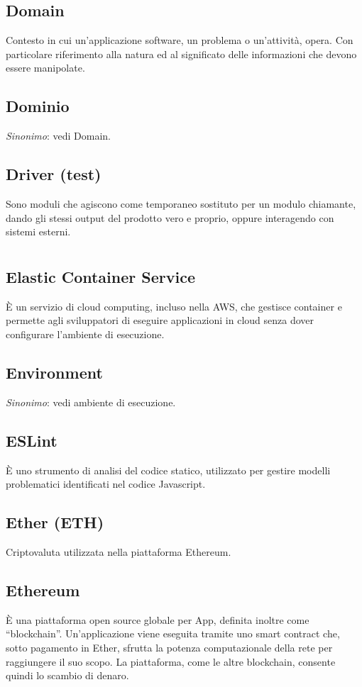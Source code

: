 	\subsection*{Domain}
	Contesto in cui un’applicazione software, un problema o un’attività, opera. Con particolare riferimento alla natura ed al significato delle informazioni che devono essere manipolate.
	\subsection*{Dominio}
	\emph{Sinonimo}: vedi Domain.
	\subsection*{Driver (test)}
	Sono moduli che agiscono come temporaneo sostituto per un modulo chiamante, dando gli stessi output del prodotto vero e proprio, oppure interagendo con sistemi esterni.
\pagebreak
\section[E]{}
	\subsection*{Elastic Container Service}
	È un servizio di cloud computing, incluso nella AWS, che gestisce container e permette agli sviluppatori di eseguire applicazioni in cloud senza dover configurare l’ambiente di esecuzione. 
	\subsection*{Environment}
	\emph{Sinonimo}: vedi ambiente di esecuzione.
	\subsection*{ESLint}
	È uno strumento di analisi del codice statico, utilizzato per gestire modelli problematici identificati nel codice Javascript.
	\subsection*{Ether (ETH)}
	Criptovaluta utilizzata nella piattaforma Ethereum.
	\subsection*{Ethereum}
	È una piattaforma open source globale per \DJ{}App, definita inoltre come “blockchain”. Un’applicazione viene eseguita tramite uno smart contract che, sotto pagamento in Ether, sfrutta la potenza computazionale della rete per raggiungere il suo scopo. La piattaforma, come le altre blockchain, consente quindi lo scambio di denaro.
